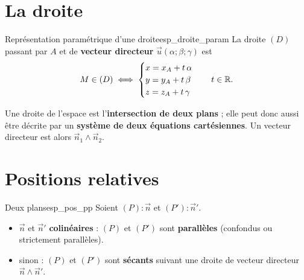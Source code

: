 \begin{center}
\end{center}


\section{La droite}

\begin{propriete}{Représentation paramétrique d'une droite}{esp_droite_param}
	La droite $(D)$ passant par $A$ et de \textbf{vecteur directeur}
	$\vec u(\alpha;\beta;\gamma)$ est
	$$
	M \in (D) \iff
	\begin{cases}
		x = x_A + t\,\alpha \\
		y = y_A + t\,\beta \\
		z = z_A + t\,\gamma
	\end{cases}
	\quad t \in \mathbb{R}.
	$$
\end{propriete}

\remarque
Une droite de l'espace est l'\textbf{intersection de deux plans} ; elle peut
donc aussi être décrite par un \textbf{système de deux équations
cartésiennes}. Un vecteur directeur est alors $\vec n_1 \wedge \vec n_2$.


\section{Positions relatives}

\begin{propriete}{Deux plans}{esp_pos_pp}
	Soient $(P) : \vec n$ et $(P') : \vec n'$.
	\begin{itemize}[label=\textbullet]
		\item $\vec n$ et $\vec n'$ \textbf{colinéaires} : $(P)$ et $(P')$ sont
		\textbf{parallèles} (confondus ou strictement parallèles).
		\item sinon : $(P)$ et $(P')$ sont \textbf{sécants} suivant une droite de
		vecteur directeur $\vec n \wedge \vec n'$.
	\end{itemize}
\end{propriete}

